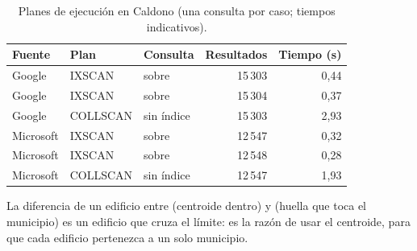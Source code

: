 \begin{table}[H]
\centering\small
\caption{Planes de ejecución en Caldono (una consulta por caso; tiempos
indicativos).}
\label{tab:evidencia-edif}
\begin{tabularx}{\textwidth}{@{}llLrr@{}}
\toprule
\textbf{Fuente} & \textbf{Plan} & \textbf{Consulta} & \textbf{Resultados} & \textbf{Tiempo (s)} \\
\midrule
Google    & IXSCAN   &  sobre    & 15\,303 & 0,44 \\
Google    & IXSCAN   &  sobre  & 15\,304 & 0,37 \\
Google    & COLLSCAN &  sin índice                 & 15\,303 & 2,93 \\
Microsoft & IXSCAN   &  sobre    & 12\,547 & 0,32 \\
Microsoft & IXSCAN   &  sobre  & 12\,548 & 0,28 \\
Microsoft & COLLSCAN &  sin índice                 & 12\,547 & 1,93 \\
\bottomrule
\end{tabularx}
\end{table}

La diferencia de un edificio entre  (centroide dentro) y
 (huella que toca el municipio) es un edificio que cruza
el límite: es la razón de usar el centroide, para que cada edificio pertenezca
a un solo municipio.
